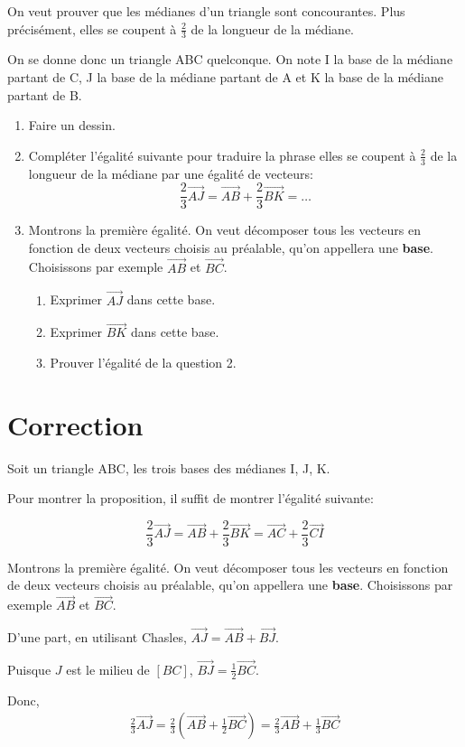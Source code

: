 \documentclass[a4paper,12pt, french, noSujetB]{article}
\date{septembre 2026}
\begin{document}
	On veut prouver que les médianes d'un triangle sont concourantes. Plus précisément, elles se coupent à $\frac{2}{3}$ de la longueur de la médiane.

	On se donne donc un triangle ABC quelconque. On note I la base de la médiane partant de C, J la base de la médiane partant de A et K la base de la médiane partant de B.

	\begin{enumerate}
		\item Faire un dessin.
		\item Compléter l'égalité suivante pour traduire la phrase \og elles se coupent à $\frac{2}{3}$ de la longueur de la médiane\fg{} par une égalité de vecteurs:
		$$\frac{2}{3}\vec{AJ} = \vec{AB}+\frac{2}{3}\vec{BK} = \dots$$
		\item Montrons la première égalité. On veut décomposer tous les vecteurs en fonction de deux vecteurs choisis au préalable, qu'on appellera une \textbf{base}. Choisissons par exemple $\vec{AB}$ et $\vec{BC}$.
		\begin{enumerate}
			\item
			Exprimer $\vec{AJ}$ dans cette base.
			\item Exprimer $\vec{BK}$ dans cette base.
			\item Prouver l'égalité de la question 2.
		\end{enumerate}
	\end{enumerate}

\newpage

\section*{Correction}
	Soit un triangle ABC, les trois bases des médianes I, J, K.

	Pour montrer la proposition, il suffit de montrer l'égalité suivante:

	$$\frac{2}{3}\vec{AJ} = \vec{AB}+\frac{2}{3}\vec{BK} = \vec{AC}+\frac{2}{3}\vec{CI}$$

	Montrons la première égalité. On veut décomposer tous les vecteurs en fonction de deux vecteurs choisis au préalable, qu'on appellera une \textbf{base}. Choisissons par exemple $\vec{AB}$ et $\vec{BC}$.

	\smallskip
	D'une part, en utilisant Chasles, $\vec{AJ} = \vec{AB}+\vec{BJ}$.

	Puisque $J$ est le milieu de $[BC]$, $\vec{BJ} = \frac{1}{2}\vec{BC}$.

	Donc, \begin{align*}
		\frac{2}{3}\vec{AJ}= \frac{2}{3}(\vec{AB}+\frac{1}{2}\vec{BC})= \frac{2}{3}\vec{AB}+\frac{1}{3}\vec{BC}
	\end{align*}
\end{document}
